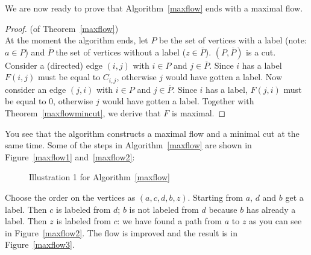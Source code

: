 We are now ready to prove that Algorithm~\ref{maxflow} ends with a
maximal flow.



\begin{proof} (of Theorem~\ref{maxflow})\\
At the moment the algorithm ends, let $P$ be the set of vertices with
a label (note: $a \in P$) and $\overline{P}$ the set of vertices
without a label ($z \in \overline{P}$). $(P,\overline{P})$ is a cut.
Consider a (directed) edge $(i,j)$ with $i \in P$ and $j \in
\overline{P}$.  Since $i$ has a label $F(i,j)$ must be equal to
$C_{i,j}$, otherwise $j$ would have gotten a label. Now consider an
edge $(j,i)$ with $i \in P$ and $j \in \overline{P}$. Since $i$ has a
label, $F(j,i)$ must be equal to 0, otherwise $j$ would have gotten a
label. Together with Theorem~\ref{maxflowmincut}, we derive that $F$
is maximal.
\end{proof}

You see that the algorithm constructs a maximal flow
and a minimal cut at the same time. Some of the steps in Algorithm~\ref{maxflow} are
shown in Figure~\ref{maxflow1} and~\ref{maxflow2}:

\begin{figure}[ht]
\begin{center}
\hspace{1cm} 
\end{center}
\caption{Illustration 1 for Algorithm~\ref{maxflow}}
\end{figure}

Choose the order on the vertices as $(a,c,d,b,z)$. Starting from $a$,
$d$ and $b$ get a label. Then $c$ is labeled from $d$; $b$ is not
labeled from $d$ because $b$ has already a label. Then $z$ is labeled
from $c$: we have found a path from $a$ to $z$ as you can see in
Figure~\ref{maxflow2}. The flow is improved and the result is in
Figure~\ref{maxflow3}.

